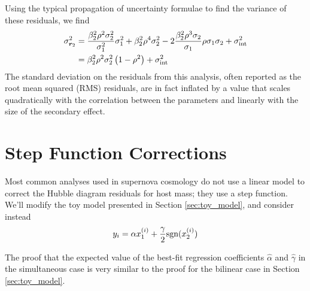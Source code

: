 Using the typical propagation of uncertainty formulae to find the variance of these residuals, we find
\begin{align}
    \sigma_{\bm{r}_2}^2 &= \frac{\beta_2^2\rho^2\sigma_2^2}{\sigma_1^2}\sigma_1^2 + \beta_2^2\rho^4\sigma_2^2 - 2\frac{\beta_2^2\rho^3\sigma_2}{\sigma_1}\rho\sigma_1\sigma_2 + \sigma_{\text{int}}^2\nonumber\\
    &= \beta_2^2\rho^2\sigma_2^2\left(1-\rho^2\right) + \sigma_{\text{int}}^2
\end{align}
The standard deviation on the residuals from this analysis, often reported as the root mean squared (RMS) residuals, are in fact inflated by a value that scales quadratically with the correlation between the parameters and linearly with the size of the secondary effect.

\section{Step Function Corrections}
\label{sec:add_step}
Most common analyses used in supernova cosmology do not use a linear model to correct the Hubble diagram residuals for host mass; they use a step function. We'll modify the toy model presented in Section \ref{sec:toy_model}, and consider instead
\begin{equation}
    y_i = \alpha x_1^{(i)} + \frac{\gamma}{2}\text{sgn}(x_2^{(i)})
\label{eqn:linear_and_step}
\end{equation}

The proof that the expected value of the best-fit regression coefficients $\hat{\alpha}$ and $\hat{\gamma}$ in the simultaneous case is very similar to the proof for the bilinear case in Section \ref{sec:toy_model}.

